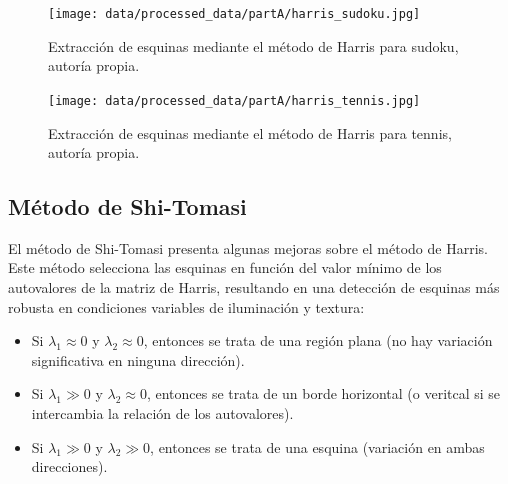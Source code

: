 \documentclass[a4paper,12pt]{article}
\begin{document}
{\begin{figure}[h!]
\end{figure}

\vspace{0.5cm}

\begin{figure}[h!]
    \centering
    \begin{minipage}[b]{0.4\textwidth}
        \centering
        \texttt{[image: data/processed\_data/partA/harris\_sudoku.jpg]}
        \caption{Extracción de esquinas mediante el método de Harris para sudoku, autoría propia.}
        \label{fig:harris-sudoku}
    \end{minipage}
    \hfill
    \begin{minipage}[b]{0.45\textwidth}
        \centering
        \texttt{[image: data/processed\_data/partA/harris\_tennis.jpg]}
        \caption{Extracción de esquinas mediante el método de Harris para tennis, autoría propia.}
        \label{fig:harris-tennis}
    \end{minipage}

\end{figure}

\newpage

\subsection{Método de Shi-Tomasi}

El método de Shi-Tomasi presenta algunas mejoras sobre el método de Harris. Este método selecciona las esquinas en 
función del valor mínimo de los autovalores de la matriz de Harris, resultando en una detección de esquinas más robusta en 
condiciones variables de iluminación y textura:

\vspace{0.5cm}  

\begin{itemize}
    \item Si \( \lambda_1 \approx 0 \) y \( \lambda_2 \approx 0 \), entonces se trata de una región plana (no hay variación significativa en ninguna dirección).
    \item Si \( \lambda_1 \gg 0 \) y \( \lambda_2 \approx 0 \), entonces se trata de un borde horizontal (o veritcal si se intercambia la relación de los autovalores).
    \item Si \( \lambda_1 \gg 0 \) y \( \lambda_2 \gg 0 \), entonces se trata de una esquina (variación en ambas direcciones).
\end{itemize}

\vspace{0.5cm}

}
\end{document}
